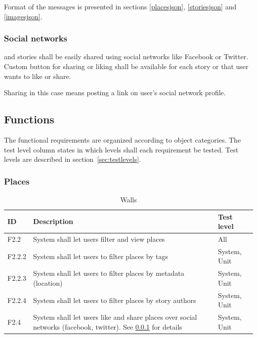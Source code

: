 \documentclass[11pt]{book}
\begin{document}
Format of the messages is presented in sections \ref{placesjson}, \ref{storiesjson} and \ref{imagesjson}.

\subsubsection{Social networks}\label{sec:req_social_networks}
\wallentitypcap and stories shall be easily shared using social networks like Facebook or Twitter. Custom button for sharing or liking shall be available for each story or \wallentitys that user wants to like or share.

Sharing in this case means posting a link on user's social network profile.

\subsection{Functions}\label{sec:functionalreq}
The functional requirements are organized according to object categories. The test level column states in which levels shall each requirement be tested. Test levels are described in section~\ref{sec:testlevels}.

\subsubsection{Places}

\begin{table}[H]
\centering
\begin{tabular}{ l  p{11cm} l }
    ID       & Description                                                                                              & Test level            \\ \hline
    F2.2     & System shall let users filter and view places                                                            & All                   \\ \hline
    F2.2.2   & System shall let users to filter places by tags                                                          & System, Unit     \\ \hline
    F2.2.3   & System shall let users to filter places by metadata (location)                                           & System, Unit     \\ \hline
    F2.2.4   & System shall let users to filter places by story authors                                                 & System, Unit     \\ \hline
    F2.4     & System shall let users like and share places over social networks (facebook, twitter). 
               See \ref{sec:req_social_networks} for details                                                            & System, Unit     \\ 
\end{tabular}
\caption{Walls}
\label{tab:req_walls}
\end{table}
\end{document}
